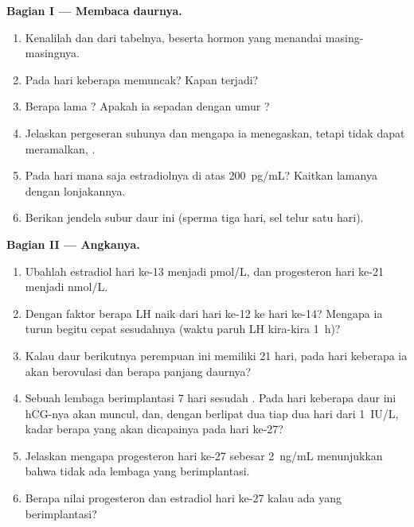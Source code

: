 \begin{problem}
\medskip
\noindent\textbf{Bagian I --- Membaca daurnya.}
\begin{enumerate}
  \item Kenalilah  dan  dari tabelnya,
        beserta hormon yang menandai masing-masingnya.
  \item Pada hari keberapa  memuncak? Kapan 
        terjadi?
  \item Berapa lama ? Apakah ia sepadan dengan umur
        ?
  \item Jelaskan pergeseran suhunya dan mengapa ia menegaskan, tetapi
        tidak dapat meramalkan, .
  \item Pada hari mana saja estradiolnya di atas \qty{200}{pg/mL}?
        Kaitkan lamanya dengan lonjakannya.
  \item Berikan jendela subur daur ini (sperma tiga hari, sel telur
        satu hari).
\end{enumerate}

\medskip
\noindent\textbf{Bagian II --- Angkanya.}
\begin{enumerate}[resume]
  \item Ubahlah estradiol hari ke-13 menjadi \unit{pmol/L}, dan
        progesteron hari ke-21 menjadi \unit{nmol/L}.
  \item Dengan faktor berapa LH naik dari hari ke-12 ke hari ke-14?
        Mengapa ia turun begitu cepat sesudahnya (waktu paruh LH
        kira-kira \qty{1}{h})?
  \item Kalau daur berikutnya perempuan ini memiliki  21
        hari, pada hari keberapa ia akan berovulasi dan berapa panjang
        daurnya?
  \item Sebuah lembaga berimplantasi 7 hari sesudah . Pada hari
        keberapa daur ini hCG-nya akan muncul, dan, dengan berlipat dua
        tiap dua hari dari \qty{1}{IU/L}, kadar berapa yang akan
        dicapainya pada hari ke-27?
  \item Jelaskan mengapa progesteron hari ke-27 sebesar \qty{2}{ng/mL}
        menunjukkan bahwa tidak ada lembaga yang berimplantasi.
  \item Berapa nilai progesteron dan estradiol hari ke-27 kalau ada
        yang berimplantasi?
\end{enumerate}


\end{problem}
